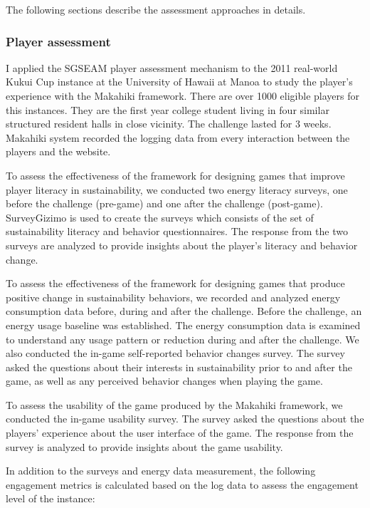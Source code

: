 The following sections describe the assessment approaches in details. 

\subsubsection{Player assessment}

I applied the SGSEAM player assessment mechanism to the 2011 real-world Kukui Cup instance at the University of Hawaii at Manoa to study the player's experience with the Makahiki framework. There are over 1000 eligible players for this instances. They are the first year college student living in four similar structured resident halls in close vicinity. The challenge lasted for 3 weeks. Makahiki system recorded the logging data from every interaction between the players and the website.

To assess the effectiveness of the framework for designing games that improve player literacy in sustainability, we
conducted two energy literacy surveys, one before the challenge (pre-game) and one after
the challenge (post-game). SurveyGizimo is used to create the surveys which consists of the set of sustainability literacy and behavior questionnaires. The response from the two surveys are analyzed to provide insights about the player's literacy and behavior change.

To assess the effectiveness of the framework for designing games that produce positive change in sustainability
behaviors, we recorded and analyzed energy consumption data before, during and after the
challenge.  Before the challenge, an energy usage baseline was established. The energy consumption data is examined to understand any usage pattern or reduction during and after the challenge. We also conducted the in-game self-reported behavior changes survey. The survey asked the questions about their interests in sustainability prior to and after the game, as well as any perceived behavior changes when playing the game.

To assess the usability of the game produced by the Makahiki framework, we conducted the in-game usability survey. The survey asked the questions about the players' experience about the user interface of the game. The response from the survey is analyzed to provide insights about the game usability.

In addition to the surveys and energy data measurement, the following engagement metrics is calculated based on the log data to assess the engagement level of the instance:

